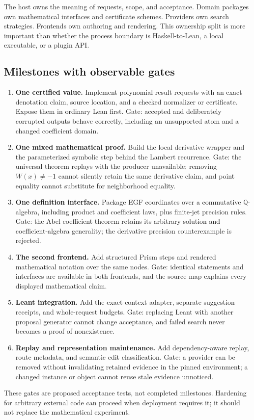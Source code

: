 \documentclass[11pt,a4paper]{article}
\newcommand{\Q}{\mathbb Q}
\theoremstyle{definition}
\theoremstyle{remark}
\begin{document}
The host owns the meaning of requests, scope, and acceptance. Domain packages own mathematical interfaces and certificate schemes. Providers own search strategies. Frontends own authoring and rendering. This ownership split is more important than whether the process boundary is Haskell-to-Lean, a local executable, or a plugin API.

\subsection{Milestones with observable gates}
\begin{enumerate}
\item \textbf{One certified value.} Implement polynomial-result requests with an exact denotation claim, source location, and a checked normalizer or certificate. Expose them in ordinary Lean first. Gate: accepted and deliberately corrupted outputs behave correctly, including an unsupported atom and a changed coefficient domain.
\item \textbf{One mixed mathematical proof.} Build the local derivative wrapper and the parameterized symbolic step behind the Lambert recurrence. Gate: the universal theorem replays with the producer unavailable; removing $W(x)\ne-1$ cannot silently retain the same derivative claim, and point equality cannot substitute for neighborhood equality.
\item \textbf{One definition interface.} Package EGF coordinates over a commutative $\Q$-algebra, including product and coefficient laws, plus finite-jet precision rules. Gate: the Abel coefficient theorem retains its arbitrary solution and coefficient-algebra generality; the derivative precision counterexample is rejected.
\item \textbf{The second frontend.} Add structured Prism steps and rendered mathematical notation over the same nodes. Gate: identical statements and interfaces are available in both frontends, and the source map explains every displayed mathematical claim.
\item \textbf{Leant integration.} Add the exact-context adapter, separate suggestion receipts, and whole-request budgets. Gate: replacing Leant with another proposal generator cannot change acceptance, and failed search never becomes a proof of nonexistence.
\item \textbf{Replay and representation maintenance.} Add dependency-aware replay, route metadata, and semantic edit classification. Gate: a provider can be removed without invalidating retained evidence in the pinned environment; a changed instance or object cannot reuse stale evidence unnoticed.
\end{enumerate}
These gates are proposed acceptance tests, not completed milestones. Hardening for arbitrary external code can proceed when deployment requires it; it should not replace the mathematical experiment.
\end{document}

